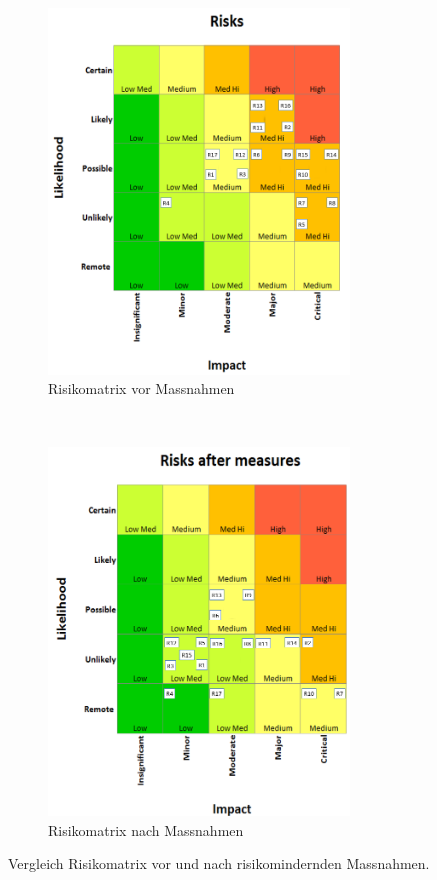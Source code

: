 \documentclass[../main.tex]{subfiles}
\begin{document}
\begin{landscape}
\begin{longtable}
\caption{Risikotabelle}
\label{tab:risikotabelle}

\end{longtable}
\normalsize    
\end{landscape}

\newpage

\begin{figure}[H]
    \centering
    \begin{subfigure}[t]{0.5\textwidth}
        \centering
        \includegraphics[width=8cm]{img/Risikomatrix/Risks_before_measures_v2_pren1.png}
        \caption{Risikomatrix vor Massnahmen}
    \end{subfigure}%
    ~ 
    \begin{subfigure}[t]{0.5\textwidth}
    \centering
       \includegraphics[width=8cm]{img/Risikomatrix/Risks_after_measures_v2_pren1.png}
       \caption{Risikomatrix nach Massnahmen}
    \end{subfigure}
    \caption{Vergleich Risikomatrix vor und nach risikomindernden Massnahmen.}
    \label{fig:risikomatrix}
\end{figure}
\end{document}
